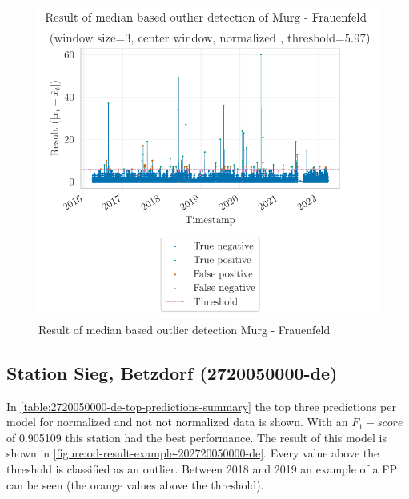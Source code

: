 \begin{figure}[htp]
    \centering 
    \includegraphics{plots/pdfs/2386-ch/od_result_median_2386-ch_all.pdf}
    \caption{Result of median based outlier detection Murg - Frauenfeld}
    \label{figure:od-result-example-2386-ch}
\end{figure}




\subsection{Station Sieg, Betzdorf (2720050000-de)}
In \autoref{table:2720050000-de-top-predictions-summary} the top three predictions per model for normalized and not not normalized data is shown. With an $F_1-score$ of 0.905109 this station had the best performance. The result of this model is shown in \autoref{figure:od-result-example-202720050000-de}. Every value above the threshold is classified as an outlier. Between 2018 and 2019 an example of a \ac{FP} can be seen (the orange values above the threshold).

